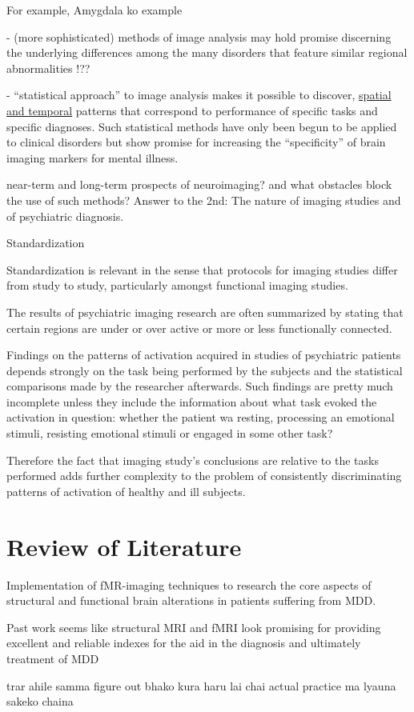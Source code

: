 \documentclass{article}
\begin{document}
For example, Amygdala ko example

- (more sophisticated) methods of image analysis may hold promise
  discerning the underlying differences among the many disorders
  that feature similar regional abnormalities !??


- ``statistical approach'' to image analysis makes it possible to
  discover, \underline{spatial and temporal} patterns that
  correspond to performance of specific tasks and specific
  diagnoses. Such statistical methods have only been begun to be
  applied to clinical disorders but show promise for increasing
  the ``specificity'' of brain imaging markers for mental illness.


near-term and long-term prospects of neuroimaging? and what
obstacles block the use of such methods? Answer to the 2nd: The
nature of imaging studies and of psychiatric diagnosis.

Standardization

Standardization is relevant in the sense that protocols for
imaging studies differ from study to study, particularly amongst
functional imaging studies.

The results of psychiatric imaging research are often summarized
by stating that certain regions are under or over active or more
or less functionally connected.

Findings on the patterns of activation acquired in studies of
psychiatric patients depends strongly on the task being performed
by the subjects and the statistical comparisons made by the
researcher afterwards. Such findings are pretty much incomplete
unless they include the information about what task evoked the
activation in question: whether the patient wa resting, processing
an emotional stimuli, resisting emotional stimuli or engaged in
some other task?

Therefore the fact that imaging study's conclusions are relative
to the tasks performed adds further complexity to the problem of
consistently discriminating patterns of activation of healthy and
ill subjects.

\newpage
\section{Review of Literature}


Implementation of fMR-imaging techniques to research the core aspects
of structural and functional brain alterations in patients suffering
from MDD.

Past work seems like structural MRI and fMRI look promising for
providing excellent and reliable indexes for the aid in the diagnosis
and ultimately treatment of MDD



trar ahile samma figure out bhako kura haru lai chai actual practice
ma lyauna sakeko chaina
\end{document}
